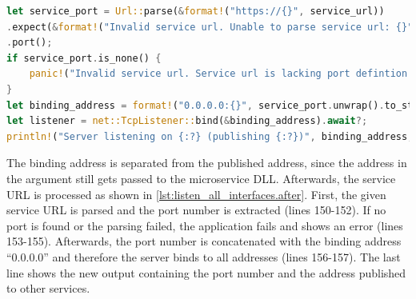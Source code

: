 \begin{lstlisting}[label=lst:listen_all_interfaces.after, caption={Listener binding after the applied changes. The service url is parsed, based on its port. Binding is done on all interfaces. (\textit{Microservices/OpenTwin/src/main.rs})}, language=rust, firstnumber=150]
let service_port = Url::parse(&format!("https://{}", service_url))
.expect(&format!("Invalid service url. Unable to parse service url: {}", service_url))
.port();
if service_port.is_none() {
	panic!("Invalid service url. Service url is lacking port defintion: {}", service_url);
}
let binding_address = format!("0.0.0.0:{}", service_port.unwrap().to_string());
let listener = net::TcpListener::bind(&binding_address).await?;
println!("Server listening on {:?} (publishing {:?})", binding_address, service_url);
\end{lstlisting}
The binding address is separated from the published address, since the address in the argument still gets passed to the microservice \ac{DLL}. Afterwards, the service \ac{URL} is processed as shown in \autoref{lst:listen_all_interfaces.after}. First, the given service \ac{URL} is parsed and the port number is extracted (lines 150-152). If no port is found or the parsing failed, the application fails and shows an error (lines 153-155). Afterwards, the port number is concatenated with the binding address \enquote{0.0.0.0} and therefore the server binds to all addresses (lines 156-157). The last line shows the new output containing the port number and the address published to other services.


